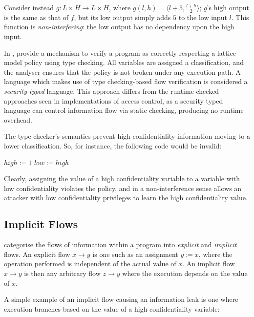 Consider instead $ g: L \times H \rightarrow L \times H $, where $ g(l, h) = \langle l + 5, \frac{l + h}{2} \rangle $; $ g $'s high output is the same as that of $ f $, but its low output simply adds $ 5 $ to the low input $ l $. This function is \textit{non-interfering}: the low output has no dependency upon the high input.

In , \citeauthor{denning1977certification} \cite{denning1977certification} provide a mechanism to verify a program as correctly respecting a lattice-model policy using type checking. All variables are assigned a classification, and the analyser ensures that the policy is not broken under any execution path. A language which makes use of type checking-based flow verification is considered a \textit{security typed} language. This approach differs from the runtime-checked approaches seen in implementations of access control, as a security typed language can control information flow via static checking, producing no runtime overhead.

The type checker's semantics prevent high confidentiality information moving to a lower classification. So, for instance, the following code would be invalid:

\begin{algorithmic}
\State $ high := 1 $
\State $ low := high $
\end{algorithmic}

Clearly, assigning the value of a high confidentiality variable to a variable with low confidentiality violates the policy, and in a non-interference sense allows an attacker with low confidentiality privileges to learn the high confidentiality value.

\subsection{Implicit Flows}

\citeauthor{denning1977certification} \cite{denning1977certification} categorise the flows of information within a program into \textit{explicit} and \textit{implicit} flows. An explicit flow $ x \rightarrow y $ is one such as an assignment $ y := x $, where the operation performed is independent of the actual value of $ x $. An implicit flow $ x \rightarrow y $ is then any arbitrary flow $ z \rightarrow y $ where the execution depends on the value of $ x $. 

A simple example of an implicit flow causing an information leak is one where execution branches based on the value of a high confidentiality variable:

